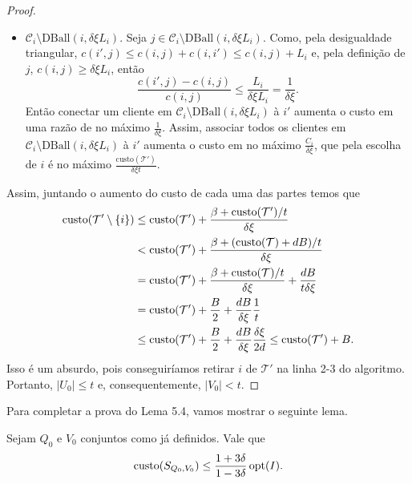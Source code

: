 \begin{proof}
\begin{itemize}
        \item $\mathcal{C}_i \setminus \text{DBall}(i,\delta\xi L_i)$. Seja $j \in \mathcal{C}_i \setminus \text{DBall}(i,\delta\xi L_i)$. Como, pela desigualdade triangular, $c(i',j) \leq c(i,j) + c(i,i') \leq c(i,j) + L_i$ e, pela definição de $j$, $c(i,j) \geq \delta\xi L_i$, então 
        \begin{equation}
            \frac{c(i',j) - c(i,j)}{ c(i,j)} \leq \frac{L_i}{\delta \xi L_i} = \frac{1}{\delta\xi}. \nonumber
        \end{equation}
        Então conectar um cliente em $\mathcal{C}_i \setminus \text{DBall}(i,\delta\xi L_i)$ à $i'$ aumenta o custo em uma razão de no máximo $\frac{1}{\delta\xi}$. Assim, associar todos os clientes em $\mathcal{C}_i \setminus \text{DBall}(i,\delta\xi L_i)$ à $i'$ aumenta o custo em no máximo $\frac{C_i}{\delta\xi}$, que pela escolha de $i$ é no máximo $\frac{\text{custo}(\mathcal{T}')}{\delta\xi t}$.
    \end{itemize}

    Assim, juntando o aumento do custo de cada uma das partes temos que
    \begin{subequations}
        \begin{align*}
            \text{custo}(\mathcal{T}'\setminus\{i\}) &\leq \text{custo}(\mathcal{T}') + \frac{\beta + \text{custo}(\mathcal{T}')/t}{\delta\xi} \\
            &<\text{custo}(\mathcal{T}') + \frac{\beta + (\text{custo}(\mathcal{T}) + dB)/t}{\delta\xi} \\
            &=\text{custo} (\mathcal{T}') + \frac{\beta + \text{custo}(\mathcal{T})/t}{\delta\xi} + \frac{dB}{t\delta\xi} \\
            &=\text{custo} (\mathcal{T}') + \frac{B}{2} + \frac{dB}{\delta\xi} \frac{1}{t} \\
            &\leq \text{custo}(\mathcal{T}') + \frac{B}{2} + \frac{dB}{\delta\xi}\frac{\delta\xi}{2d} \leq \text{custo}(\mathcal{T}') + B.
        \end{align*}
    \end{subequations}
    Isso é um absurdo, pois conseguiríamos retirar $i$ de $\mathcal{T}'$ na linha 2-3 do algoritmo. Portanto, $|U_0| \leq t$ e, consequentemente, $|V_0| < t$.
\end{proof}
Para completar a prova do Lema 5.4, vamos mostrar o seguinte lema.
\begin{lemma}
    Sejam $Q_0$ e $V_0$ conjuntos como já definidos. Vale que 
    \begin{equation}
        \text{custo}(S_{Q_0,V_0}) \leq \frac{1+3\delta}{1-3\delta}\,\mathrm{opt}(I). \nonumber
    \end{equation}
\end{lemma}
